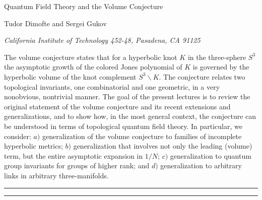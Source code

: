 \documentclass[letterpaper,12pt]{article}
\numberwithin{equation}{section}
\newcommand{\bs}{\backslash}
\renewcommand{\=}{\;=\;}
\begin{document}
\pagestyle{empty}

\begin{flushright} 
\end{flushright}
\vspace{.8in}

\begin{center}{\LARGE Quantum Field Theory and the Volume Conjecture} \end{center}

\vspace{.1cm}

\begin{center}{\large Tudor Dimofte and Sergei Gukov} \end{center}
\begin{center} {\it California Institute of Technology 452-48,
Pasadena, CA 91125} \end{center}

\vspace{1in}



The volume conjecture
states that for a hyperbolic knot $K$ in the three-sphere $S^3$
the asymptotic growth of the colored Jones polynomial of $K$
is governed by the hyperbolic volume of the knot complement $S^3\bs K$.
The conjecture relates two topological invariants, one combinatorial
and one geometric, in a very nonobvious, nontrivial manner.
The goal of the present lectures
is to review the original statement
of the volume conjecture and its recent extensions and generalizations,
and to show how, in the most general context, the conjecture can be understood
in terms of topological quantum field theory.
In particular, we consider:
$a)$ generalization of the volume conjecture to families of incomplete hyperbolic metrics;
$b)$ generalization that involves not only the leading (volume) term,
but the entire asymptotic expansion in $1/N$;
$c)$ generalization to quantum group invariants for groups of higher rank; and
$d)$ generalization to arbitrary links in arbitrary three-manifolds.

\newpage
\setcounter{page}{1}
\pagestyle{plain}

\noindent\rule{\textwidth}{0.01cm}
\tableofcontents
\noindent\rule{\textwidth}{0.01cm}
\vspace{.5in}
\end{document}
